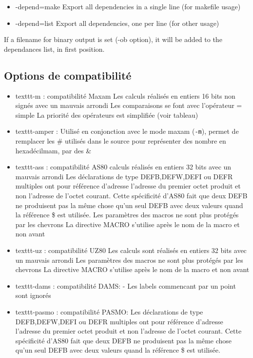 \begin{xen}
  \begin{itemize}
    \item -depend=make  Export all dependencies in a single line (for makefile usage)
    \item -depend=list  Export all dependencies, one per line (for other usage)
  \end{itemize}
  If a filename for binary output is set (-ob option), it will be added to the dependances list, in first position.
\end{xen}

\begin{xfr}
\subsection{Options de compatibilité}
\begin{itemize}
\item texttt{-m} : compatibilité Maxam
 \subitem Les calculs réalisés en entiers 16 bits non signés avec un mauvais arrondi
 \subitem Les comparaisons se font avec l'opérateur = simple
 \subitem La priorité des opérateurs est simplifiée (voir tableau)
\item texttt{-amper} : Utilisé en conjonction avec le mode maxam (\texttt{-m}), permet de remplacer les \# utilisés dans le source pour représenter des nombre en hexadécilmam, par des \&

\item texttt{-ass} : compatibilité AS80
 \subitem calculs réalisés en entiers 32 bits avec un mauvais arrondi
 \subitem Les déclarations de type DEFB,DEFW,DEFI ou DEFR multiples ont pour référence d'adresse l'adresse du premier octet produit et non l'adresse de l'octet courant. Cette spécificité d'AS80 fait que deux DEFB ne produisent pas la même chose qu'un seul DEFB avec deux valeurs quand la référence \$ est utilisée.
 \subitem Les paramètres des macros ne sont plus protégés par les chevrons {}
 \subitem La directive MACRO s'utilise après le nom de la macro et non avant

\item texttt{-uz} : compatibilité UZ80
 \subitem Les calculs sont réalisés en entiers 32 bits avec un mauvais arrondi
 \subitem Les paramètres des macros ne sont plus protégés par les chevrons {}
 \subitem La directive MACRO s'utilise après le nom de la macro et non avant

\item texttt{-dams} : compatibilité DAMS:
\subitem - Les labels commencant par un point sont ignorés

\item texttt{-pasmo} : compatibilité PASMO:
\subitem Les déclarations de type DEFB,DEFW,DEFI ou DEFR multiples ont pour référence d'adresse l'adresse du premier octet produit et non l'adresse de l'octet courant. Cette spécificité d'AS80 fait que deux DEFB ne produisent pas la même chose qu'un seul DEFB avec deux valeurs quand la référence \$ est utilisée.
\end{itemize}

\end{xfr}

